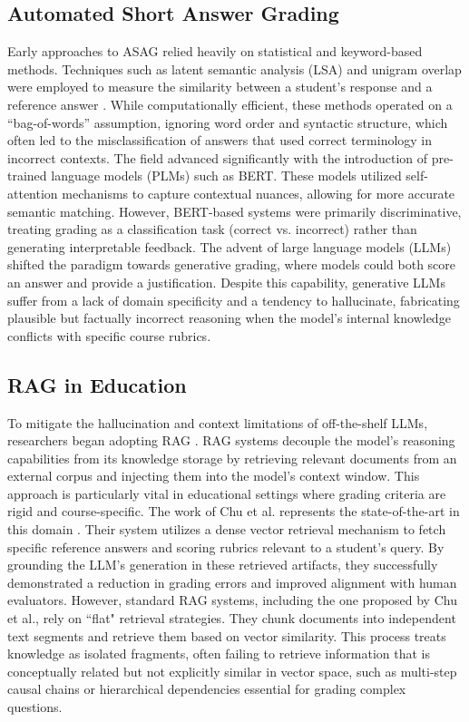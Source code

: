 \documentclass{edm_article}
\begin{document}
\subsection{Automated Short Answer Grading}
Early approaches to ASAG relied heavily on statistical and keyword-based methods. Techniques such as latent semantic analysis (LSA) and unigram overlap were employed to measure the similarity between a student's response and a reference answer \cite{foltz1999automatically, mohler2011learning}. While computationally efficient, these methods operated on a ``bag-of-words'' assumption, ignoring word order and syntactic structure, which often led to the misclassification of answers that used correct terminology in incorrect contexts. The field advanced significantly with the introduction of pre-trained language models (PLMs) such as BERT. These models utilized self-attention mechanisms to capture contextual nuances, allowing for more accurate semantic matching. However, BERT-based systems were primarily discriminative, treating grading as a classification task (correct vs. incorrect) rather than generating interpretable feedback. The advent of large language models (LLMs) shifted the paradigm towards generative grading, where models could both score an answer and provide a justification. Despite this capability, generative LLMs suffer from a lack of domain specificity and a tendency to hallucinate, fabricating plausible but factually incorrect reasoning when the model's internal knowledge conflicts with specific course rubrics.

\subsection{RAG in Education}
To mitigate the hallucination and context limitations of off-the-shelf LLMs, researchers began adopting RAG \cite{fan2024survey}. RAG systems decouple the model's reasoning capabilities from its knowledge storage by retrieving relevant documents from an external corpus and injecting them into the model's context window. This approach is particularly vital in educational settings where grading criteria are rigid and course-specific. The work of Chu et al. represents the state-of-the-art in this domain \cite{chu2025enhancing}. Their system utilizes a dense vector retrieval mechanism to fetch specific reference answers and scoring rubrics relevant to a student's query. By grounding the LLM's generation in these retrieved artifacts, they successfully demonstrated a reduction in grading errors and improved alignment with human evaluators. However, standard RAG systems, including the one proposed by Chu et al., rely on ``flat" retrieval strategies. They chunk documents into independent text segments and retrieve them based on vector similarity. This process treats knowledge as isolated fragments, often failing to retrieve information that is conceptually related but not explicitly similar in vector space, such as multi-step causal chains or hierarchical dependencies essential for grading complex questions.
\end{document}
